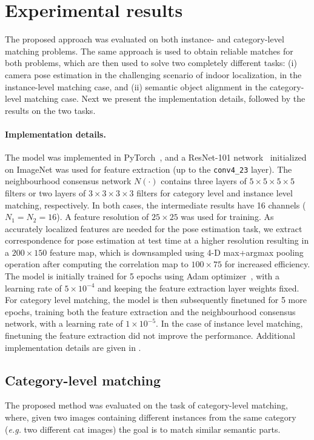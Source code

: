\documentclass{article}
\begin{document}
\section{Experimental results}
The proposed approach was evaluated on both instance- and category-level matching problems. The same approach is used to obtain reliable matches for both problems, which are then used to solve two completely different tasks: (i) camera pose estimation in the challenging scenario of indoor localization, in the instance-level matching case, and (ii) semantic object alignment in the category-level matching case. Next we present the implementation details, followed by the results on the two tasks.

\paragraph{Implementation details.}
The model was implemented in PyTorch~\cite{pytorch}, and a ResNet-101 network~\cite{he2016deep} initialized on ImageNet was used for feature extraction (up to the \texttt{conv4\_23} layer). The neighbourhood consensus network $N(\cdot)$ contains three layers of $5\times 5\times 5\times 5$ filters or two layers of $3\times 3\times 3\times 3$ filters for category level and instance level matching, respectively. In both cases, the intermediate results have 16 channels ($N_1=N_2=16$).
A feature resolution of $25\times 25$ was used for training. As accurately localized features are needed for the pose estimation task, we extract correspondence for pose estimation at test time at a higher resolution resulting in a $200\times 150$ feature map, which is downsampled using 4-D max+argmax pooling operation after computing the correlation map to $100\times 75$ for increased efficiency.
The model is initially trained for 5 epochs using Adam optimizer~\cite{kingma2015adam}, with a learning rate of $5 \times 10^{-4}$ and keeping the feature extraction layer weights fixed.
For category level matching, the model is then subsequently finetuned for 5 more epochs, training both the feature extraction and the neighbourhood consensus network, with a learning rate of $1 \times 10^{-5}$. In the case of instance level matching, finetuning the feature extraction did not improve the performance. Additional implementation details are given in .


\subsection{Category-level matching}
The proposed method was evaluated on the task of category-level matching, where, given two images containing different instances from the same category (\emph{e.g.} two different cat images) the goal is to match similar semantic parts.
\end{document}
